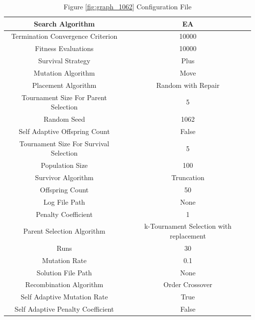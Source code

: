 \documentclass{standalone}
\begin{document}
\begin{table}[!htb]
	\centering
	\caption{Figure \ref{fig:graph_1062} Configuration File}
	\label{tab:graph_1062}
	\begin{tabular}{| c | c |}
		\hline
		Search Algorithm		& EA		 \\
		\hline
		Termination Convergence Criterion		& 10000		 \\
		\hline
		Fitness Evaluations		& 10000		 \\
		\hline
		Survival Strategy		& Plus		 \\
		\hline
		Mutation Algorithm		& Move		 \\
		\hline
		Placement Algorithm		& Random with Repair		 \\
		\hline
		Tournament Size For Parent Selection		& 5		 \\
		\hline
		Random Seed		& 1062		 \\
		\hline
		Self Adaptive Offspring Count		& False		 \\
		\hline
		Tournament Size For Survival Selection		& 5		 \\
		\hline
		Population Size		& 100		 \\
		\hline
		Survivor Algorithm		& Truncation		 \\
		\hline
		Offspring Count		& 50		 \\
		\hline
		Log File Path		& None		 \\
		\hline
		Penalty Coefficient		& 1		 \\
		\hline
		Parent Selection Algorithm		& k-Tournament Selection with replacement		 \\
		\hline
		Runs		& 30		 \\
		\hline
		Mutation Rate		& 0.1		 \\
		\hline
		Solution File Path		& None		 \\
		\hline
		Recombination Algorithm		& Order Crossover		 \\
		\hline
		Self Adaptive Mutation Rate		& True		 \\
		\hline
		Self Adaptive Penalty Coefficient		& False		 \\
		\hline
	\end{tabular}
\end{table}
\end{document}

